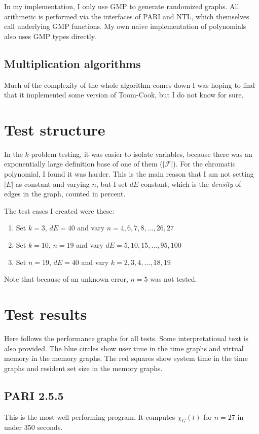 \documentclass[a4paper, titlepage]{article}
\begin{document}
In my implementation, I only use GMP to generate randomized graphs. All arithmetic is performed via the interfaces of PARI and NTL, which themselves call underlying GMP functions. My own naive implementation of polynomials also uses GMP types directly.

\subsection{Multiplication algorithms}
Much of the complexity of the whole algorithm comes down 
 I was hoping to find that it implemented some version of Toom-Cook\cite{toom-cook}, but I do not know for sure.

\section{Test structure}
In the $k$-problem testing, it was easier to isolate variables, because there was an exponentially large definition base of one of them ($|\mathcal{F}|$). For the chromatic polynomial, I found it was harder. This is the main reason that I am not setting $|E|$ as constant and varying $n$, but I set $dE$ constant, which is the \emph{density} of edges in the graph, counted in percent.

The test cases I created were these:

\begin{enumerate}
 \item Set $k=3$, $dE=40$ and vary $n = 4, 6, 7, 8, \ldots, 26, 27$
 \item Set $k=10$, $n=19$ and vary $dE= 5, 10, 15, \ldots, 95, 100$
 \item Set $n=19$, $dE=40$ and vary $k = 2, 3, 4, \ldots, 18, 19$
\end{enumerate}

Note that because of an unknown error, $n=5$ was not tested.

\newpage
\section{Test results}
Here follows the performance graphs for all tests. Some interpretational text is also provided. The blue circles show user time in the time graphs and virtual memory in the memory graphs. The red squares show system time in the time graphs and resident set size in the memory graphs.

\subsection{PARI 2.5.5}
This is the most well-performing program. It computes $\chi_G(t)$ for $n=27$ in under 350 seconds.
\end{document}
